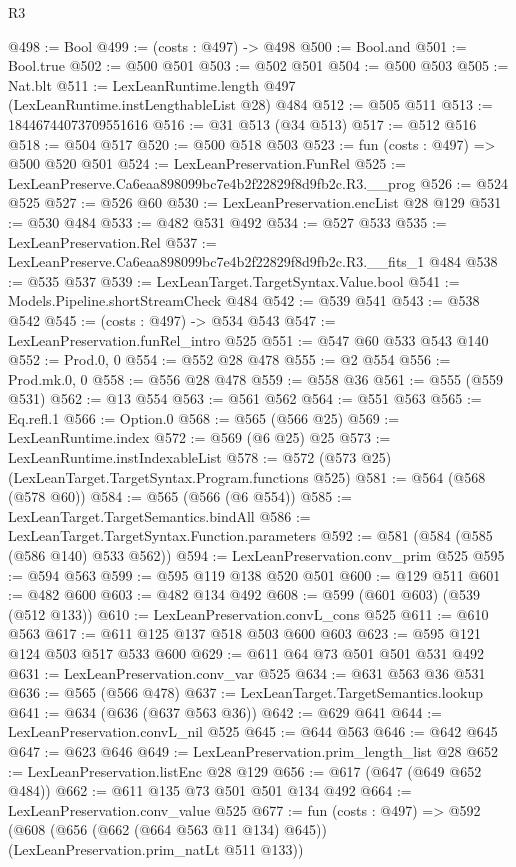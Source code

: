 \begin{lexlean}{R3}
\begin{coremodule}
@498 := Bool
@499 := (costs : @497) -> @498
@500 := Bool.and
@501 := Bool.true
@502 := @500 @501
@503 := @502 @501
@504 := @500 @503
@505 := Nat.blt
@511 := LexLeanRuntime.length @497 (LexLeanRuntime.instLengthableList @28) @484
@512 := @505 @511
@513 := 18446744073709551616
@516 := @31 @513 (@34 @513)
@517 := @512 @516
@518 := @504 @517
@520 := @500 @518 @503
@523 := fun (costs : @497) => @500 @520 @501
@524 := LexLeanPreservation.FunRel
@525 := LexLeanPreserve.Ca6eaa898099bc7e4b2f22829f8d9fb2c.R3.__prog
@526 := @524 @525
@527 := @526 @60
@530 := LexLeanPreservation.encList @28 @129
@531 := @530 @484
@533 := @482 @531 @492
@534 := @527 @533
@535 := LexLeanPreservation.Rel
@537 := LexLeanPreserve.Ca6eaa898099bc7e4b2f22829f8d9fb2c.R3.__fits_1 @484
@538 := @535 @537
@539 := LexLeanTarget.TargetSyntax.Value.bool
@541 := Models.Pipeline.shortStreamCheck @484
@542 := @539 @541
@543 := @538 @542
@545 := (costs : @497) -> @534 @543
@547 := LexLeanPreservation.funRel_intro @525
@551 := @547 @60 @533 @543 @140
@552 := Prod.{0, 0}
@554 := @552 @28 @478
@555 := @2 @554
@556 := Prod.mk.{0, 0}
@558 := @556 @28 @478
@559 := @558 @36
@561 := @555 (@559 @531)
@562 := @13 @554
@563 := @561 @562
@564 := @551 @563
@565 := Eq.refl.{1}
@566 := Option.{0}
@568 := @565 (@566 @25)
@569 := LexLeanRuntime.index
@572 := @569 (@6 @25) @25
@573 := LexLeanRuntime.instIndexableList
@578 := @572 (@573 @25) (LexLeanTarget.TargetSyntax.Program.functions @525)
@581 := @564 (@568 (@578 @60))
@584 := @565 (@566 (@6 @554))
@585 := LexLeanTarget.TargetSemantics.bindAll
@586 := LexLeanTarget.TargetSyntax.Function.parameters
@592 := @581 (@584 (@585 (@586 @140) @533 @562))
@594 := LexLeanPreservation.conv_prim @525
@595 := @594 @563
@599 := @595 @119 @138 @520 @501
@600 := @129 @511
@601 := @482 @600
@603 := @482 @134 @492
@608 := @599 (@601 @603) (@539 (@512 @133))
@610 := LexLeanPreservation.convL_cons @525
@611 := @610 @563
@617 := @611 @125 @137 @518 @503 @600 @603
@623 := @595 @121 @124 @503 @517 @533 @600
@629 := @611 @64 @73 @501 @501 @531 @492
@631 := LexLeanPreservation.conv_var @525
@634 := @631 @563 @36 @531
@636 := @565 (@566 @478)
@637 := LexLeanTarget.TargetSemantics.lookup
@641 := @634 (@636 (@637 @563 @36))
@642 := @629 @641
@644 := LexLeanPreservation.convL_nil @525
@645 := @644 @563
@646 := @642 @645
@647 := @623 @646
@649 := LexLeanPreservation.prim_length_list @28
@652 := LexLeanPreservation.listEnc @28 @129
@656 := @617 (@647 (@649 @652 @484))
@662 := @611 @135 @73 @501 @501 @134 @492
@664 := LexLeanPreservation.conv_value @525
@677 := fun (costs : @497) =>
  @592 (@608 (@656 (@662 (@664 @563 @11 @134) @645)) (LexLeanPreservation.prim_natLt @511 @133))

\end{coremodule}
\end{lexlean}
